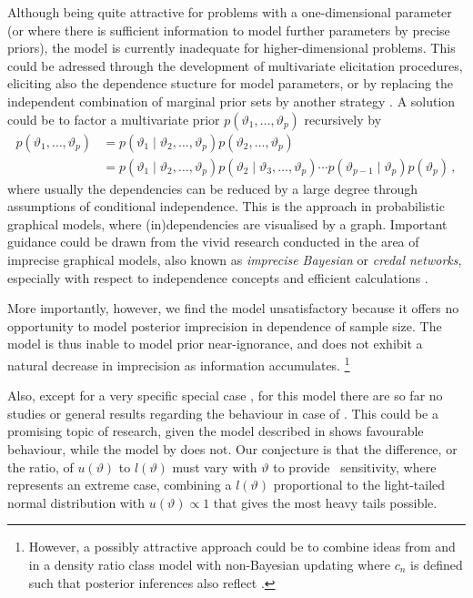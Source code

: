 Although being quite attractive for problems with a one-dimensional parameter
(or where there is sufficient information to model further parameters by precise priors),
the model is currently inadequate for higher-dimensional problems.
This could be adressed through the development of multivariate elicitation procedures,
eliciting also the dependence stucture for model parameters,
or by replacing the independent combination of marginal prior sets
by another strategy \parencite[as mentioned in][\S 5.2]{2011:rinderknecht:diss}.
A solution could be to factor a multivariate prior $p(\vartheta_1,\ldots,\vartheta_p)$
recursively by
\begin{align*}
p(\vartheta_1,\ldots,\vartheta_p)
 &= p(\vartheta_1\mid \vartheta_2,\ldots,\vartheta_p) p(\vartheta_2,\ldots,\vartheta_p) \\
 &= p(\vartheta_1\mid \vartheta_2,\ldots,\vartheta_p) p(\vartheta_2\mid \vartheta_3,\ldots,\vartheta_p)
    \cdots p(\vartheta_{p-1}\mid\vartheta_p) p(\vartheta_p)\,,
\end{align*}
where usually the dependencies can be reduced by a large degree through assumptions of conditional independence.
This is the approach in probabilistic graphical models,
where (in)dependencies are visualised by a graph.
Important guidance could be drawn from the vivid research conducted in the area
of imprecise graphical models, also known as \emph{imprecise Bayesian} or \emph{credal networks},
especially with respect to independence concepts and efficient calculations
\parencite[for a recent overview, see][]{itip-ipgms}.

More importantly, however, we find the model unsatisfactory because it offers no opportunity
to model posterior imprecision in dependence of sample size. %
The model is thus inable to model prior near-ignorance, and does not exhibit
a natural decrease in imprecision as information accumulates.%
\footnote{However, a possibly attractive approach could be to
combine ideas from \textcite{1993:coolen} and \textcite{2011:rinderknecht:diss}
in a density ratio class model with non-Bayesian updating
where $c_n$ is defined such that posterior inferences also reflect \pdc.}

Also, except for a very specific special case \parencite[\S 4.3, as discussed above]{1991:pericchi},
for this model there are so far no studies or general results regarding the behaviour in case of \pdc.
This could be a promising topic of research,
given the model described in \textcite[\S 4.3]{1991:pericchi} shows favourable behaviour,
while the model by \textcite{1993:coolen} does not.
Our conjecture is that the difference, or the ratio, of $u(\vartheta)$ to $l(\vartheta)$
must vary with $\vartheta$ to provide \pdc\ sensitivity,
where \textcite[\S 4.3]{1991:pericchi} represents an extreme case,
combining a $l(\vartheta)$ proportional to the light-tailed normal distribution %
with $u(\vartheta) \propto 1$ that gives the most heavy tails possible.



